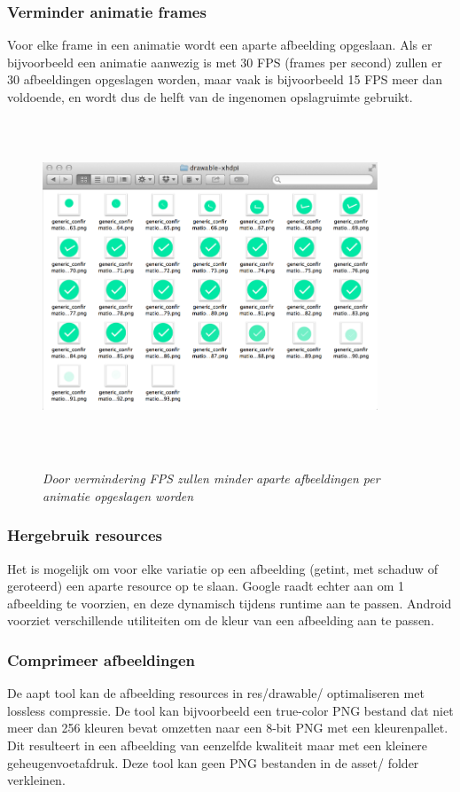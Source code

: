 \subsubsection{Verminder animatie frames }
\label{sec:reduceanimationframes}
Voor elke frame in een animatie wordt een aparte afbeelding opgeslaan. Als er bijvoorbeeld een animatie aanwezig is met 30 FPS (frames per second) zullen er 30 afbeeldingen opgeslagen worden, maar vaak is bijvoorbeeld 15 FPS meer dan voldoende, en wordt dus de helft van de ingenomen opslagruimte gebruikt.
\begin{figure}[h]
	\caption{\textit{Door vermindering FPS zullen minder aparte afbeeldingen per animatie opgeslagen worden}\newline}
	\includegraphics[width=10cm, height=10cm, keepaspectratio]{img/animation-frames}\\[.5cm]
	\centering
\end{figure}
\subsubsection{Hergebruik resources }
\label{sec:reuseresources}
Het is mogelijk om voor elke variatie op een afbeelding (getint, met schaduw of geroteerd) een aparte resource op te slaan. Google raadt echter aan om 1 afbeelding te voorzien, en deze dynamisch tijdens runtime aan te passen. 
Android voorziet verschillende utiliteiten om de kleur van een afbeelding aan te passen.
\subsubsection{Comprimeer afbeeldingen }
\label{sec:compressimages}
De aapt tool kan de afbeelding resources in res/drawable/ optimaliseren met lossless compressie. De tool kan bijvoorbeeld een true-color PNG bestand dat niet meer dan 256 kleuren bevat omzetten naar een 8-bit PNG met een kleurenpallet. Dit resulteert in een afbeelding van eenzelfde kwaliteit maar met een kleinere geheugenvoetafdruk. Deze tool kan geen PNG bestanden in de asset/ folder verkleinen. 

